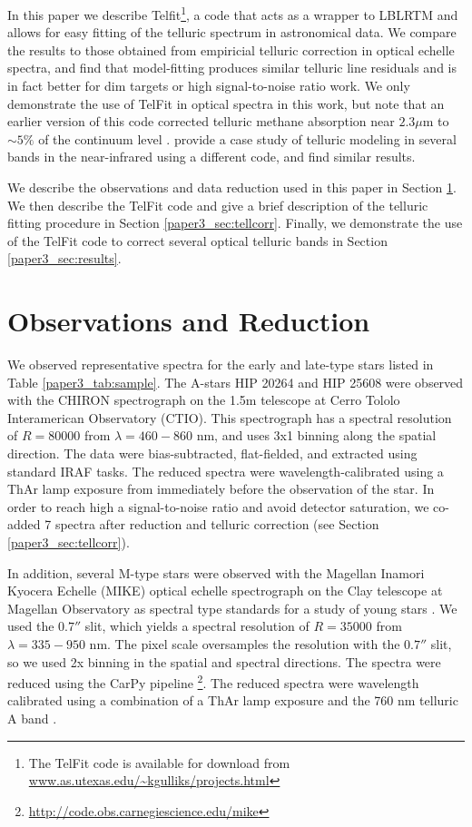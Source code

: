 In this paper we describe Telfit\footnote{The TelFit code is available for download from \url{www.as.utexas.edu/~kgulliks/projects.html}}, a code that acts as a wrapper to LBLRTM and allows for easy fitting of the telluric spectrum in astronomical data. We compare the results to those obtained from empiricial telluric correction in optical echelle spectra, and find that model-fitting produces similar telluric line residuals and is in fact better for dim targets or high signal-to-noise ratio work. We only demonstrate the use of TelFit in optical spectra in this work, but note that an earlier version of this code corrected telluric methane absorption near $2.3 \mu$m to $\sim 5\%$ of the continuum level \citep{Gullikson2013}. \cite{Seifahrt2011} provide a case study of telluric modeling in several bands in the near-infrared using a different code, and find similar results.


We describe the observations and data reduction used in this paper in Section \ref{paper3_sec:obs}. We then describe the TelFit code and give a brief description of the telluric fitting procedure in Section \ref{paper3_sec:tellcorr}. Finally, we demonstrate the use of the TelFit code to correct several optical telluric bands in Section \ref{paper3_sec:results}. 




\section{Observations and Reduction}
\label{paper3_sec:obs}
We observed representative spectra for the early and late-type stars listed in Table \ref{paper3_tab:sample}. The A-stars HIP 20264 and HIP 25608 were observed with the CHIRON spectrograph on the 1.5m telescope at Cerro Tololo Interamerican Observatory (CTIO). This spectrograph has a spectral resolution of $R = 80000$ from $\lambda = 460 - 860$ nm, and uses 3x1 binning along the spatial direction. The data were bias-subtracted, flat-fielded, and extracted using standard IRAF tasks. The reduced spectra were wavelength-calibrated using a ThAr lamp exposure from immediately before the observation of the star. In order to reach high a signal-to-noise ratio and avoid detector saturation, we co-added 7 spectra after reduction and telluric correction (see Section \ref{paper3_sec:tellcorr}).

In addition, several M-type stars were observed with the Magellan Inamori Kyocera Echelle (MIKE) optical echelle spectrograph on the Clay telescope at Magellan Observatory as spectral type standards for a study of young stars \citep{Kraus2014}. We used the $0.7''$ slit, which yields a spectral resolution of $R = 35000$ from $\lambda = 335 - 950$ nm. The pixel scale oversamples the resolution with the $0.7''$ slit, so we used 2x binning in the spatial and spectral directions. The spectra were reduced using the CarPy pipeline \citep{Kelson2003}\footnote{\url{http://code.obs.carnegiescience.edu/mike}}. The reduced spectra were wavelength calibrated using a combination of a ThAr lamp exposure and the 760 nm telluric A band \citep[see][for details]{Kraus2014}.

